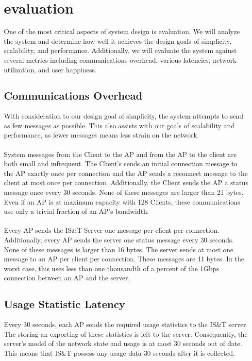 \documentclass[10pt,journal,compsoc]{IEEEtran}
\begin{document}
		\section{evaluation}
		One of the most critical aspects of system design is evaluation. We will analyze the system and determine how well it achieves the design goals of simplicity, scalability, and performance. Additionally, we will evaluate the system against several metrics including communications overhead, various latencies, network utilization, and user happiness.
		
		\subsection{Communications Overhead}
		With consideration to our design goal of simplicity, the system attempts to send as few messages as possible. This also assists with our goals of scalability and performance, as fewer messages means less strain on the network.\\
		\\
		System messages from the Client to the AP and from the AP to the client are both small and infrequent. The Client's sends an initial connection message to the AP exactly once per connection and the AP sends a reconnect message to the client at most once per connection. Additionally, the Client sends the AP a status message once every 30 seconds. None of these messages are larger than 21 bytes. Even if an AP is at maximum capacity with 128 Clients, these communications use only a trivial fraction of an AP's bandwidth.\\
		\\
		Every AP sends the IS\&T Server one message per client per connection. Additionally, every AP sends the server one status message every 30 seconds. None of these messages is larger than 16 bytes. The server sends at most one message to an AP per client per connection. These messages are 11 bytes. In the worst case, this uses less than one thousandth of a percent of the 1Gbps connection between an AP and the server.
		
		\subsection{Usage Statistic Latency}
		Every 30 seconds, each AP sends the required usage statistics to the IS\&T server. The storing an exporting of these statistics is left to the server. Consequently, the server's model of the network state and usage is at most 30 seconds out of date. This means that IS\&T possess any usage data 30 seconds after it is collected.
		
\end{document}
